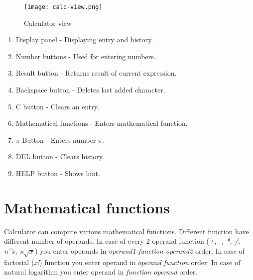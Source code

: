 \documentclass{article}
\begin{document}
  \begin{figure}[H]
    \centering
    \texttt{[image: calc-view.png]}
  \caption{Calculator view}
\end{figure}

\begin{enumerate}
\item Display panel - Displaying entry and history.
\item Number buttons - Used for entering numbers.
\item Result button - Returns result of current expression.
\item Backspace button - Deletes last added character.
\item C button - Clears an entry.
\item Mathematical functions - Enters mathematical function.
\item $\pi$ Button - Enters number $\pi$.
\item DEL button - Clears history.
\item HELP button - Shows hint.
\end{enumerate}

\newpage
\section{Mathematical functions}
\label{mf}
Calculator can compute various mathematical functions. Different function have different number of operands. In case of every 2 operand function (\emph{+, -, *, /, n\^{}x, n$\sqrt{x}$}) you enter operands in \emph{operand1 function operand2} order. In case of factorial (\emph{x!}) function you enter operand in \emph{operand function} order. In case of natural logarithm you enter operand in \emph{function operand} order.
\end{document}
